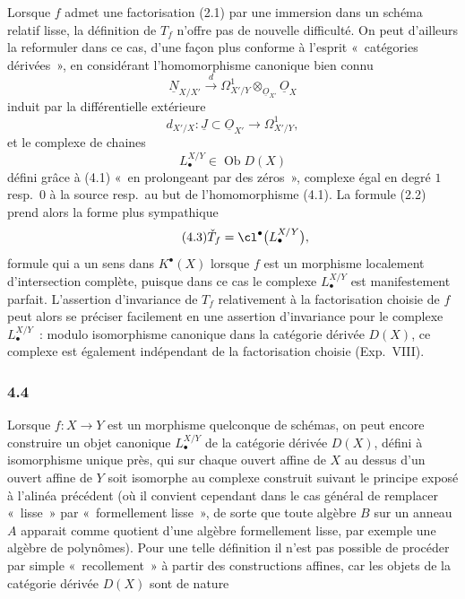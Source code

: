 Lorsque $f$ admet une factorisation (2.1) par une immersion dans un sch\'ema relatif lisse, la d\'efinition de $T_f$ n'offre pas de nouvelle difficult\'e. On peut d'ailleurs la reformuler dans ce cas, d'une fa\c{c}on plus conforme \`a l'esprit «~cat\'egories d\'eriv\'ees~», en consid\'erant l'homomorphisme canonique bien connu
\begin{equation}\tag{4 1}
\underline N_{X/X'}\xrightarrow{d}\Omega^1_{X'/Y}\otimes_{\underline O_{X'}}\underline O_X
\end{equation}
induit par la diff\'erentielle ext\'erieure
\[
d_{X'/X}:\underline J\subset\underline O_{X'}\longrightarrow\Omega^1_{X'/Y},
\]
et le complexe de chaines
\begin{equation}\tag{4.2}
L^{X/Y}_\bullet\in\operatorname{Ob}D(X)
\end{equation}
d\'efini gr\^ace \`a (4.1) «~en prolongeant par des z\'eros~», complexe \'egal en degr\'e $1$ resp.\ $0$ \`a la source resp.\ au but de l'homomorphisme (4.1). La formule (2.2) prend alors la forme plus sympathique
\begin{equation}\tag{4.3}
\check T_f=\cl^\bullet\bigl(L^{X/Y}_\bullet\bigr),
\end{equation}
formule qui a un sens dans $K^\bullet(X)$ lorsque $f$ est un morphisme localement d'intersection compl\`ete, puisque dans ce cas le complexe $L^{X/Y}_\bullet$ est manifestement parfait. L'assertion d'invariance de $T_f$ relativement \`a la factorisation choisie de $f$ peut alors se pr\'eciser facilement en une assertion d'invariance pour le complexe $L^{X/Y}_\bullet$~: modulo isomorphisme canonique dans la cat\'egorie d\'eriv\'ee $D(X)$, ce complexe est \'egalement ind\'ependant de la factorisation choisie (Exp.\ VIII).

\subsubsection*{4.4}
Lorsque $f:X\to Y$ est un morphisme quelconque de sch\'emas, on peut encore construire un objet canonique $L^{X/Y}_\bullet$ de la cat\'egorie d\'eriv\'ee $D(X)$, d\'efini \`a isomorphisme unique pr\`es, qui sur chaque ouvert affine de $X$ au dessus d'un ouvert affine de $Y$ soit isomorphe au complexe construit suivant le principe expos\'e \`a l'alin\'ea pr\'ec\'edent (o\`u il convient cependant dans le cas g\'en\'eral de remplacer «~lisse~» par «~formellement lisse~», de sorte que toute alg\`ebre $B$ sur un anneau $A$ apparait comme quotient d'une alg\`ebre formellement lisse, par exemple une alg\`ebre de polyn\^omes). Pour une telle d\'efinition il n'est pas possible de proc\'eder par simple «~recollement~» \`a partir des constructions affines, car les objets de la cat\'egorie d\'eriv\'ee $D(X)$ sont de nature
